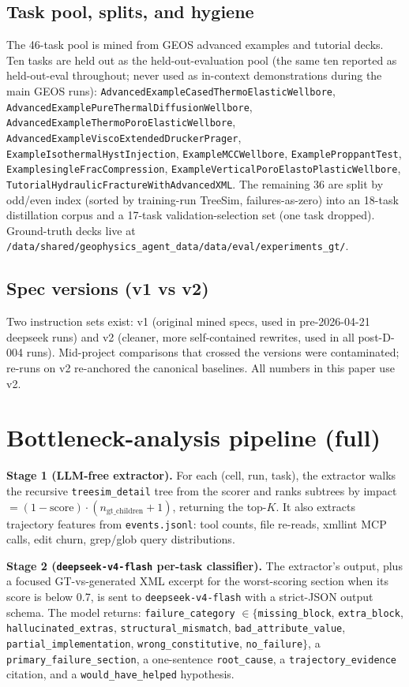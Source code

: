 \documentclass{article}
\begin{document}
\subsection{Task pool, splits, and hygiene}
The 46-task pool is mined from GEOS advanced examples and tutorial decks. Ten tasks are held out as the held-out-evaluation pool (the same ten reported as held-out-eval throughout; never used as in-context demonstrations during the main GEOS runs): \texttt{AdvancedExampleCasedThermoElasticWellbore}, \texttt{AdvancedExamplePureThermalDiffusionWellbore}, \texttt{AdvancedExampleThermoPoroElasticWellbore}, \texttt{AdvancedExampleViscoExtendedDruckerPrager}, \texttt{ExampleIsothermalHystInjection}, \texttt{ExampleMCCWellbore}, \texttt{ExampleProppantTest}, \texttt{ExamplesingleFracCompression}, \texttt{ExampleVerticalPoroElastoPlasticWellbore}, \texttt{TutorialHydraulicFractureWithAdvancedXML}. The remaining 36 are split by odd/even index (sorted by training-run TreeSim, failures-as-zero) into an 18-task distillation corpus and a 17-task validation-selection set (one task dropped). Ground-truth decks live at \texttt{/data/shared/geophysics\_agent\_data/data/eval/experiments\_gt/}.

\subsection{Spec versions (v1 vs v2)}
Two instruction sets exist: v1 (original mined specs, used in pre-2026-04-21 deepseek runs) and v2 (cleaner, more self-contained rewrites, used in all post-D-004 runs). Mid-project comparisons that crossed the versions were contaminated; re-runs on v2 re-anchored the canonical baselines. All numbers in this paper use v2.

\section{Bottleneck-analysis pipeline (full)}
\label{app:bottleneck}

\textbf{Stage 1 (LLM-free extractor).} For each (cell, run, task), the extractor walks the recursive \texttt{treesim\_detail} tree from the scorer and ranks subtrees by impact $= (1 - \mathrm{score}) \cdot (n_{\mathrm{gt\_children}} + 1)$, returning the top-$K$. It also extracts trajectory features from \texttt{events.jsonl}: tool counts, file re-reads, xmllint MCP calls, edit churn, grep/glob query distributions.

\textbf{Stage 2 (\texttt{deepseek-v4-flash} per-task classifier).} The extractor's output, plus a focused GT-vs-generated XML excerpt for the worst-scoring section when its score is below 0.7, is sent to \texttt{deepseek-v4-flash} with a strict-JSON output schema. The model returns: \texttt{failure\_category} $\in \{$\texttt{missing\_block}, \texttt{extra\_block}, \texttt{hallucinated\_extras}, \texttt{structural\_mismatch}, \texttt{bad\_attribute\_value}, \texttt{partial\_implementation}, \texttt{wrong\_constitutive}, \texttt{no\_failure}$\}$, a \texttt{primary\_failure\_section}, a one-sentence \texttt{root\_cause}, a \texttt{trajectory\_evidence} citation, and a \texttt{would\_have\_helped} hypothesis.
\end{document}
